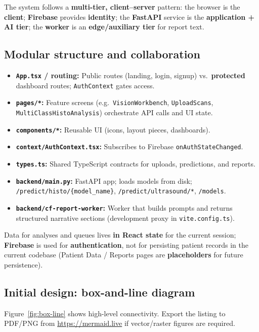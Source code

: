 The system follows a \textbf{multi-tier, client--server} pattern: the browser is the \textbf{client}; \textbf{Firebase} provides \textbf{identity}; the \textbf{FastAPI} service is the \textbf{application + AI tier}; the \textbf{worker} is an \textbf{edge/auxiliary tier} for report text.

\subsection{Modular structure and collaboration}

\begin{itemize}
  \item \textbf{\texttt{App.tsx} / routing:} Public routes (landing, login, signup) vs.\ \textbf{protected} dashboard routes; \texttt{AuthContext} gates access.
  \item \textbf{\texttt{pages/*}:} Feature screens (e.g.\ \texttt{VisionWorkbench}, \texttt{UploadScans}, \texttt{MultiClassHistoAnalysis}) orchestrate API calls and UI state.
  \item \textbf{\texttt{components/*}:} Reusable UI (icons, layout pieces, dashboards).
  \item \textbf{\texttt{context/AuthContext.tsx}:} Subscribes to Firebase \texttt{onAuthStateChanged}.
  \item \textbf{\texttt{types.ts}:} Shared TypeScript contracts for uploads, predictions, and reports.
  \item \textbf{\texttt{backend/main.py}:} FastAPI app; loads models from disk; \texttt{/predict/histo/\{model\_name\}}, \texttt{/predict/ultrasound/*}, \texttt{/models}.
  \item \textbf{\texttt{backend/cf-report-worker}:} Worker that builds prompts and returns structured narrative sections (development proxy in \texttt{vite.config.ts}).
\end{itemize}

Data for analyses and queues lives \textbf{in React state} for the current session; \textbf{Firebase} is used for \textbf{authentication}, not for persisting patient records in the current codebase (Patient Data / Reports pages are \textbf{placeholders} for future persistence).

\subsection{Initial design: box-and-line diagram}

Figure~\ref{fig:box-line} shows high-level connectivity. Export the listing to PDF/PNG from \url{https://mermaid.live} if vector/raster figures are required.

